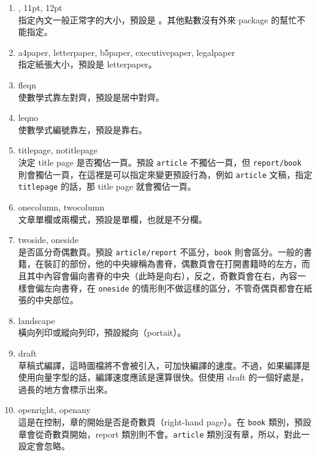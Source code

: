 \begin{enumerate}
   \item {\ttfamily 10pt, 11pt, 12pt}\\
         指定內文一般正常字的大小，預設是 {\ttfamily 10pt}。其他點數沒有外來 package 的幫忙不能指定。
   \item {\ttfamily a4paper, letterpaper, b5paper, executivepaper, legalpaper}\\
         指定紙張大小，預設是 {\ttfamily letterpaper}。
   \item {\ttfamily fleqn} \\
         使數學式靠左對齊，預設是居中對齊。
   \item {\ttfamily leqno} \\
         使數學式編號靠左，預設是靠右。
   \item {\ttfamily titlepage, notitlepage} \\
         決定 title page 是否獨佔一頁。預設 \texttt{article} 不獨佔一頁，但 \texttt{report/book} 則會獨佔一頁，在這裡是可以指定來變更預設行為，例如 \texttt{article} 文稿，指定 \texttt{titlepage} 的話，那 title page 就會獨佔一頁。
   \item {\ttfamily onecolumn, twocolumn} \\
         文章單欄或兩欄式，預設是單欄，也就是不分欄。
   \item {\ttfamily twoside, oneside} \\
         是否區分奇偶數頁。預設 \texttt{article/report} 不區分，\texttt{book} 則會區分。一般的書籍，在裝訂的部份，他的中央線稱為書脊，偶數頁會在打開書籍時的左方，而且其中內容會偏向書脊的中央（此時是向右），反之，奇數頁會在右，內容一樣會偏左向書脊，在 \texttt{oneside} 的情形則不做這樣的區分，不管奇偶頁都會在紙張的中央部位。
   \item {\ttfamily landscape} \\
         橫向列印或縱向列印，預設縱向（portait）。
   \item {\ttfamily draft} \\
         草稿式編譯，這時圖檔將不會被引入，可加快編譯的速度。不過，如果編譯是使用向量字型的話，編譯速度應該是還算很快。但使用 {\ttfamily draft} 的一個好處是，過長的地方會標示出來。
   \item {\ttfamily openright, openany} \\
         這是在控制，章的開始是否是奇數頁（right-hand page）。在 \texttt{book} 類別，預設章會從奇數頁開始，report 類別則不會。\texttt{article} 類別沒有章，所以，對此一設定會忽略。
\end{enumerate}

